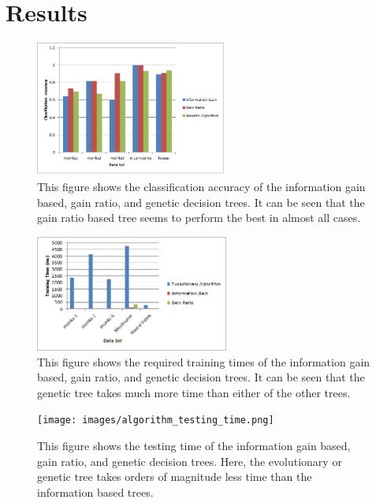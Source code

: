 \documentclass[12pt, letterpaper]{article}
\begin{document}
\section{Results}
\begin{figure}
\begin{center}
\includegraphics[width=2.5in]{images/algorithm_comparison_accuracy.png}
\end{center}
\caption{This figure shows the classification accuracy of the information gain
based, gain ratio, and genetic decision trees.  It can be seen that the gain 
ratio based tree seems to perform the best in almost all cases.}
\label{Classification Accuracies of Multiple Decision Trees}
\end{figure}

\begin{figure}
\begin{center}
\includegraphics[width=2.5in]{images/algorithm_comparison_training_time.png}
\end{center}
\caption{This figure shows the required training times of the information gain
based, gain ratio, and genetic decision trees.  It can be seen that the genetic
tree takes much more time than either of the other trees.}
\label{Training Times of Multiple Decision Trees}
\end{figure}

\begin{figure}
\begin{center}
\texttt{[image: images/algorithm\_testing\_time.png]}
\end{center}
\caption{This figure shows the testing time of the information gain
based, gain ratio, and genetic decision trees.  Here, the evolutionary or 
genetic tree takes orders of magnitude less time than the information based
trees.}
\label{Testing Times of Multiple Decision Trees}
\end{figure}
\end{document}
